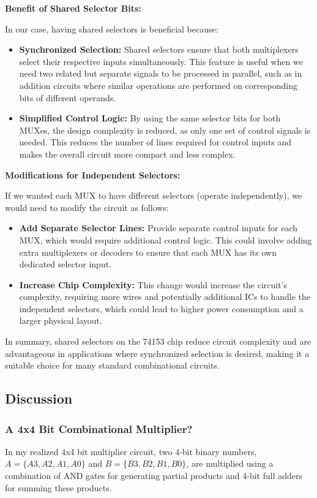 \documentclass[12pt]{article}
\begin{document}
\textbf{Benefit of Shared Selector Bits:}

In our case, having shared selectors is beneficial because:
\begin{itemize}
	\item \textbf{Synchronized Selection:} Shared selectors ensure that both multiplexers select their respective inputs simultaneously. This feature is useful when we need two related but separate signals to be processed in parallel, such as in addition circuits where similar operations are performed on corresponding bits of different operands.
	\item \textbf{Simplified Control Logic:} By using the same selector bits for both MUXes, the design complexity is reduced, as only one set of control signals is needed. This reduces the number of lines required for control inputs and makes the overall circuit more compact and less complex.
\end{itemize}

\textbf{Modifications for Independent Selectors:}

If we wanted each MUX to have different selectors (operate independently), we would need to modify the circuit as follows:
\begin{itemize}
	\item \textbf{Add Separate Selector Lines:} Provide separate control inputs for each MUX, which would require additional control logic. This could involve adding extra multiplexers or decoders to ensure that each MUX has its own dedicated selector input.
	\item \textbf{Increase Chip Complexity:} This change would increase the circuit’s complexity, requiring more wires and potentially additional ICs to handle the independent selectors, which could lead to higher power consumption and a larger physical layout.
\end{itemize}

In summary, shared selectors on the 74153 chip reduce circuit complexity and are advantageous in applications where synchronized selection is desired, making it a suitable choice for many standard combinational circuits.
\subsection*{Discussion}
\subsubsection*{A 4x4 Bit Combinational Multiplier?}
In my realized 4x4 bit multiplier circuit, two 4-bit binary numbers, \( A = \{A3, A2, A1, A0\} \) and \( B = \{B3, B2, B1, B0\} \), are multiplied using a combination of AND gates for generating partial products and 4-bit full adders for summing these products.
\end{document}

